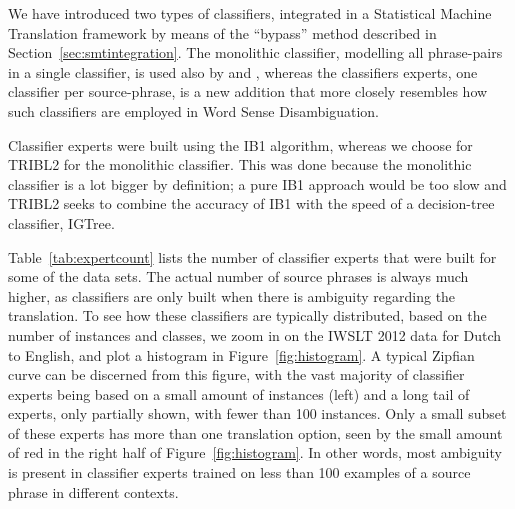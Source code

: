 We have introduced two types of classifiers, integrated in a Statistical
Machine Translation framework by means of the ``bypass'' method described in
Section~\ref{sec:smtintegration}. The monolithic classifier, modelling all phrase-pairs
in a single classifier, is used also by \cite{Stroppa+07} and
\cite{Rejwanul+11}, whereas the classifiers experts, one classifier per
source-phrase, is a new addition that more closely resembles how such
classifiers are employed in Word Sense Disambiguation.

Classifier experts were built using the IB1 algorithm, whereas we choose for
TRIBL2 for the monolithic classifier. This was done because the monolithic
classifier is a lot bigger by definition; a pure IB1 approach would be too slow
and TRIBL2 seeks to combine the accuracy of IB1 with the speed of a
decision-tree classifier, IGTree.

Table~\ref{tab:expertcount} lists the number of classifier experts that were
built for some of the data sets. The actual number of source phrases is always
much higher, as classifiers are only built when there is ambiguity regarding
the translation. To see how these classifiers are typically distributed, based
on the number of instances and classes, we zoom in on the IWSLT 2012 data for
Dutch to English, and plot a histogram in
Figure~\ref{fig:histogram}. A typical Zipfian curve can be discerned from
this figure, with the vast majority of classifier experts being based
on a small amount of instances (left) and a long tail of experts, only
partially shown, with fewer than 100 instances. Only a small subset of
these experts has more than one translation option, seen by the small
amount of red in the right half of Figure~\ref{fig:histogram}. In
other words, most ambiguity is present in classifier experts trained on less than
100 examples of a source phrase in different contexts. 

